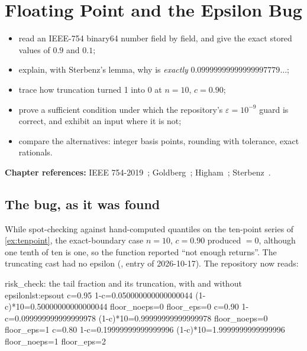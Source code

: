 \chapter{Floating Point and the Epsilon Bug}\label{ch:float}

\begin{objectives}
\begin{itemize}
\item read an IEEE-754 binary64 number field by field, and give the exact stored values of $0.9$ and $0.1$;
\item explain, with Sterbenz's lemma, why  is \emph{exactly} $0.09999999999999997779\ldots$;
\item trace how truncation turned  1 into 0 at $n=10$, $c=0.90$;
\item prove a sufficient condition under which the repository's $\varepsilon=10^{-9}$ guard is correct, and exhibit an input where it is not;
\item compare the alternatives: integer basis points, rounding with tolerance, exact rationals.
\end{itemize}
{\small\color{muted}\textbf{Chapter references:} IEEE 754-2019~\cite{ieee754-2019}; Goldberg~\cite{goldberg1991what}; Higham~\cite{higham2002accuracy};
Sterbenz~\cite{sterbenz1974floating}.}
\end{objectives}

\section{The bug, as it was found}
While spot-checking  against hand-computed quantiles on the ten-point series of
\cref{ex:tenpoint}, the exact-boundary case $n=10$, $c=0.90$ produced  $=0$, although one tenth of ten
is one, so the function reported ``not enough returns''. The truncating cast had no epsilon (,
entry of 2026-10-17). The repository now reads:


\begin{progout}{risk\_check: the tail fraction and its truncation, with and without epsilon}{lst:epsout}
c=0.95 1-c=0.050000000000000044 (1-c)*10=0.50000000000000044 floor_noeps=0 floor_eps=0
c=0.90 1-c=0.099999999999999978 (1-c)*10=0.99999999999999978 floor_noeps=0 floor_eps=1
c=0.80 1-c=0.19999999999999996 (1-c)*10=1.9999999999999996 floor_noeps=1 floor_eps=2
\end{progout}

